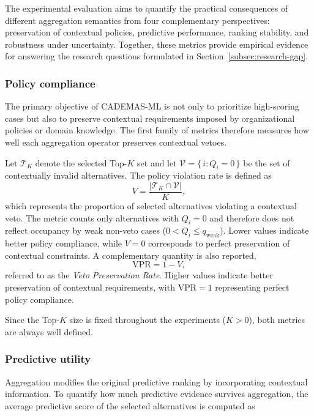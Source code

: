 \documentclass[mathematics,article,submit,moreauthors]{Definitions/mdpi}
\begin{document}
The experimental evaluation aims to quantify the practical consequences
of different aggregation semantics from four complementary
perspectives: preservation of contextual policies, predictive
performance, ranking stability, and robustness under uncertainty.
Together, these metrics provide empirical evidence for answering the
research questions formulated in Section~\ref{subsec:research-gap}.

\subsubsection{Policy compliance}

The primary objective of CADEMAS-ML is not only to prioritize
high-scoring cases but also to preserve contextual requirements imposed
by organizational policies or domain knowledge. {\color{teal}The first
family of metrics therefore measures how well each aggregation operator
preserves contextual vetoes.}

Let $\mathcal{T}_K$ denote the selected Top-$K$ set and let $\mathcal{V}
= \{\,i:Q_i=0\,\}$ be the set of contextually invalid alternatives. The policy violation rate is defined as
\begin{equation}
V = \frac{|\mathcal{T}_K\cap\mathcal{V}|}{K},
\end{equation}
which represents the proportion of selected alternatives violating a
contextual veto. The metric counts only alternatives with $Q_i=0$ and
therefore does not reflect occupancy by weak non-veto cases
($0<Q_i\le q_{\mathrm{weak}}$). Lower values indicate better policy
compliance, while $V=0$ corresponds to perfect preservation of
contextual constraints. {\color{teal}A complementary quantity is also reported,}
\begin{equation}
\mathrm{VPR} = 1-V,
\end{equation}
referred to as the \emph{Veto Preservation Rate}. Higher values indicate
better preservation of contextual requirements, with
$\mathrm{VPR}=1$ representing perfect policy compliance.

Since the Top-$K$ size is fixed throughout the experiments ($K>0$), both
metrics are always well defined.

\subsubsection{Predictive utility}

Aggregation modifies the original predictive ranking by incorporating
contextual information. {\color{teal}To quantify how much predictive
evidence survives aggregation, the average predictive score of the
selected alternatives is computed as}
\end{document}
